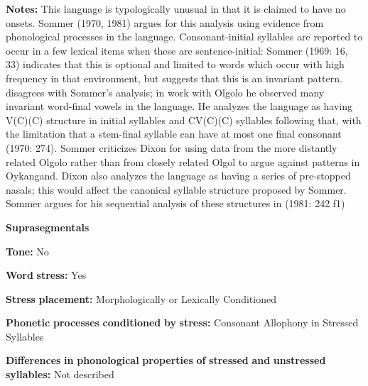 \begin{styleBody}
\textbf{Notes:} This language is typologically unusual in that it is claimed to have no onsets. Sommer (1970, 1981) argues for this analysis using evidence from phonological processes in the language. Consonant-initial syllables are reported to occur in a few lexical items when these are sentence-initial: Sommer (1969: 16, 33) indicates that this is optional and limited to words which occur with high frequency in that environment, but \citet{Sommer1981} suggests that this is an invariant pattern. \citet{Dixon1970} disagrees with Sommer’s analysis; in work with Olgolo he observed many invariant word-final vowels in the language. He analyzes the language as having V(C)(C) structure in initial syllables and CV(C)(C) syllables following that, with the limitation that a stem-final syllable can have at most one final consonant (1970: 274). Sommer criticizes Dixon for using data from the more distantly related Olgolo rather than from closely related Olgol to argue against patterns in Oykangand. Dixon also analyzes the language as having a series of pre-stopped nasals; this would affect the canonical syllable structure proposed by Sommer. Sommer argues for his sequential analysis of these structures in (1981: 242 f1)
\end{styleBody}

\begin{styleBody}
\textbf{Suprasegmentals}
\end{styleBody}

\begin{styleBody}
\textbf{Tone:} No
\end{styleBody}

\begin{styleBody}
\textbf{Word} \textbf{stress:} Yes
\end{styleBody}

\begin{styleBody}
\textbf{Stress} \textbf{placement:} Morphologically or Lexically Conditioned
\end{styleBody}

\begin{styleBody}
\textbf{Phonetic} \textbf{processes} \textbf{conditioned} \textbf{by} \textbf{stress:} Consonant Allophony in Stressed Syllables
\end{styleBody}

\begin{styleBody}
\textbf{Differences} \textbf{in} \textbf{phonological} \textbf{properties} \textbf{of} \textbf{stressed} \textbf{and} \textbf{unstressed} \textbf{syllables:} Not described
\end{styleBody}

